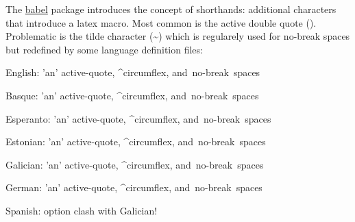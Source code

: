 \documentclass[a4paper]{article}
\begin{document}
The \href{http://www.ctan.org/packages/babel}{babel} package introduces the concept of \textquotedbl{}shorthands\textquotedbl{}: additional
characters that introduce a latex macro. Most common is the active double
quote (\textquotedbl{}). Problematic is the tilde character (\textasciitilde{}) which is regularely used
for no-break spaces but redefined by some language definition files:

English: 'an' \textquotedbl{}active\textquotedbl{}-quote, \textasciicircum{}circumflex, and~no-break~spaces

\foreignlanguage{basque}{Basque: 'an' \textquotedbl{}active\textquotedbl{}-quote, \textasciicircum{}circumflex, and~no-break~spaces}

\foreignlanguage{esperanto}{Esperanto: 'an' \textquotedbl{}active\textquotedbl{}-quote, \textasciicircum{}circumflex, and~no-break~spaces}

\foreignlanguage{estonian}{Estonian: 'an' \textquotedbl{}active\textquotedbl{}-quote, \textasciicircum{}circumflex, and~no-break~spaces}

\foreignlanguage{galician}{Galician: 'an' \textquotedbl{}active\textquotedbl{}-quote, \textasciicircum{}circumflex, and~no-break~spaces}

\foreignlanguage{ngerman}{German: 'an' \textquotedbl{}active\textquotedbl{}-quote, \textasciicircum{}circumflex, and~no-break~spaces}

Spanish: option clash with Galician!

% 
\end{document}
